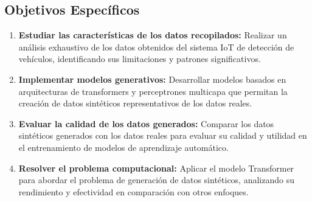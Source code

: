 \subsection{Objetivos Específicos}
\begin{enumerate}
    \item \textbf{Estudiar las características de los datos recopilados:}
    Realizar un análisis exhaustivo de los datos obtenidos del sistema IoT de
    detección de vehículos, identificando sus limitaciones y patrones
    significativos. 
    \item \textbf{Implementar modelos generativos:} Desarrollar
    modelos basados en arquitecturas de transformers y perceptrones multicapa
    que permitan la creación de datos sintéticos representativos de los datos
    reales.
    \item \textbf{Evaluar la calidad de los datos generados:} Comparar los datos
    sintéticos generados con los datos reales para evaluar su calidad y utilidad
    en el entrenamiento de modelos de aprendizaje automático. 
    \item \textbf{Resolver el problema computacional:} Aplicar el modelo Transformer
    para abordar el problema de generación de datos sintéticos, analizando su
    rendimiento y efectividad en comparación con otros enfoques.
\end{enumerate}
